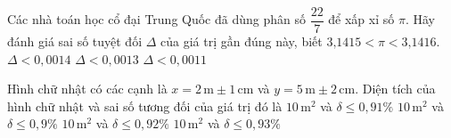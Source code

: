 \begin{ex}%
	Các nhà toán học cổ đại Trung Quốc đã dùng phân số $\dfrac{22}{7}$ để xấp xỉ số $\pi$. Hãy đánh giá sai số tuyệt đối $\Delta$ của giá trị gần đúng này, biết $3\text{,}1415<\pi<3\text{,}1416$.
	{\True$\Delta<0{,}0014$}
	{$\Delta<0{,}0013$}
	{$\Delta<0{,}0011$}
\end{ex}

\begin{ex}%
	Hình chữ nhật có các cạnh là $x = 2 \mathrm{\, m} \pm 1 \mathrm{\, cm}$ và $y = 5 \mathrm{\, m} \pm 2 \mathrm{\, cm}$. Diện tích của hình chữ nhật và sai số tương đối của giá trị đó là
	\choice
	{$10 \mathrm{\, m}^2$ và $\delta \leq 0{,}91 \%$}
	{\True $10 \mathrm{\, m}^2$ và $\delta \leq 0{,}9 \%$}
	{$10 \mathrm{\, m}^2$ và $\delta \leq 0{,}92 \%$}
	{$10 \mathrm{\, m}^2$ và $\delta \leq 0{,}93 \%$}
\end{ex}
